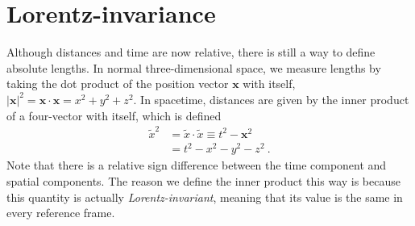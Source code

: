 \section{Lorentz-invariance}
Although distances and time are now relative, there is still a way to define absolute lengths. In normal three-dimensional space, we measure lengths by taking the dot product of the position vector $\mathbf{x}$ with itself, $|\mathbf{x}|^2 = \mathbf{x}\cdot\mathbf{x} = x^2+y^2+z^2$. In spacetime, distances are given by the inner product of a four-vector with itself, which is defined
\begin{equation}
\begin{aligned}
    \tilde{x}^2 &= \tilde{x}\cdot\tilde{x} \equiv t^2 - \mathbf{x}^2 \\
    &= t^2-x^2-y^2-z^2 \ . 
\end{aligned}
\end{equation}
Note that there is a relative sign difference between the time component and spatial components. The reason we define the inner product this way is because this quantity is actually {\it Lorentz-invariant}, meaning that its value is the same in every reference frame. 

